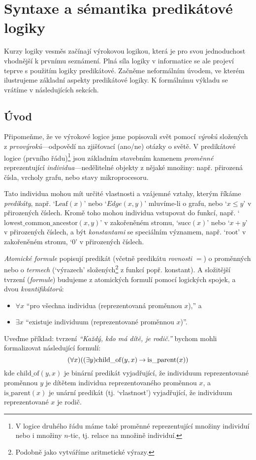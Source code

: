 \chapter{Syntaxe a sémantika predikátové logiky}

Kurzy logiky vesměs začínají výrokovou logikou, která je pro svou jednoduchost vhodnější k prvnímu seznámení. Plná síla logiky v informatice se ale projeví teprve s použitím logiky predikátové.
Začněme neformálním úvodem, ve kterém ilustrujeme základní aspekty predikátové logiky. K formálnímu výkladu se vrátíme v následujících sekcích.

\section{Úvod}
Připomeňme, že ve výrokové logice jsme popisovali svět pomocí \emph{výroků} složených z \emph{prvovýroků}---odpovědí na zjišťovací (ano/ne) otázky o světě. V predikátové logice (prvního řádu)\footnote{V logice druhého řádu máme také proměnné reprezentující množiny individuí nebo i množiny $n$-tic, tj. relace na množině individuí.} jsou základním stavebním kamenem \emph{proměnné} reprezentující \emph{individua}---nedělitelné objekty z nějaké množiny: např. přirozená čísla, vrcholy grafu, nebo stavy mikroprocesoru. 

Tato individua mohou mít určité vlastnosti a vzájemné vztahy, kterým říkáme \emph{predikáty}, např. `$\mathrm{Leaf}(x)$' nebo `$Edge(x,y)$' mluvíme-li o grafu, nebo `$x\leq y$' v přirozených číslech. Kromě toho mohou individua vstupovat do funkcí, např. `$\mathrm{lowest\_common\_ancestor}(x,y)$' v zakořeněném stromu, `$\mathrm{succ}(x)$' nebo `$x+y$' v přirozených číslech, a být \emph{konstantami} se speciálním významem, např. `$\mathrm{root}$' v zakořeněném stromu, `$0$' v přirozených číslech. 

\emph{Atomické formule} popisují predikát (včetně predikátu \emph{rovnosti} $=$) o proměnných nebo o \emph{termech} (`výrazech' složených\footnote{Podobně jako vytváříme aritmetické výrazy.} z funkcí popř. konstant). A složitější tvrzení (\emph{formule}) budujeme z atomických formulí pomocí logických spojek, a dvou \emph{kvantifikátorů}: 
\begin{itemize}
    \item $\forall x$ ``pro všechna individua (reprezentovaná proměnnou $x$),'' a
    \item $\exists x$ ``existuje individuum (reprezentované proměnnou $x$)''.
\end{itemize}
Uveďme příklad: tvrzení \textit{``Každý, kdo má dítě, je rodič.''} bychom mohli formalizovat následující formulí:
$$
(\forall x)((\exists y)\mathrm{child\_of}(y,x)\mathbin{\rightarrow}\mathrm{is\_parent}(x))
$$
kde $\mathrm{child\_of}(y,x)$ je binární predikát vyjadřující, že individuum reprezentované proměnnou $y$ je dítětem individua reprezentovaného proměnnou $x$, a $\mathrm{is\_parent}(x)$ je unární predikát (tj. `vlastnost') vyjadřující, že individuum reprezentované $x$ je rodič.

